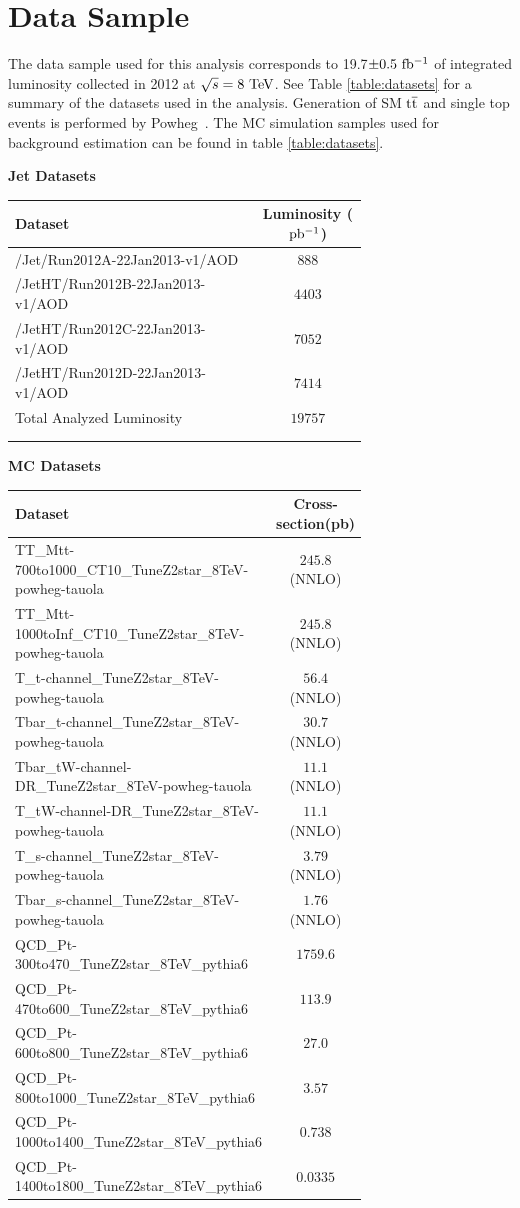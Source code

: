 \section{Data Sample}
\label{sec:datasampleAndSelection}
The data sample used for this analysis corresponds to 19.7$\pm0.5~\mathrm{fb^{-1}}$ of integrated 
luminosity collected in 2012 at $\sqrt{s} = 8~\mathrm{TeV}$.  See Table \ref{table:datasets} for a summary of the datasets used in the analysis.
Generation of SM $\mathrm{t\overline{t}}$ and single top events is performed by Powheg~\cite{Oleari:2010nx}.  
The MC simulation samples used for background estimation can be found in table \ref{table:datasets}.

\begin{table}
\begin{center}
\bf{Jet Datasets}
\begin{tabular}{p{0.7\linewidth}|c}
\hline\hline
\bf{Dataset} & \bf{Luminosity ($\mathrm{pb^{-1}}$)} \\
\hline\hline
/Jet/Run2012A-22Jan2013-v1/AOD & $888$ \\
/JetHT/Run2012B-22Jan2013-v1/AOD & $4403$ \\
/JetHT/Run2012C-22Jan2013-v1/AOD & $7052$ \\
/JetHT/Run2012D-22Jan2013-v1/AOD & $7414$ \\
Total Analyzed Luminosity & $19757$ \\
\hline 
\\
\\
\end{tabular}
\bf{MC Datasets} \\
\begin{tabular}{p{0.7\linewidth}|c}
\hline\hline
\bf{Dataset} & \bf{Cross-section(pb)} \\
\hline\hline
TT\_Mtt-700to1000\_CT10\_TuneZ2star\_8TeV-powheg-tauola & $245.8$ (NNLO)\\
TT\_Mtt-1000toInf\_CT10\_TuneZ2star\_8TeV-powheg-tauola & $245.8$ (NNLO)\\
T\_t-channel\_TuneZ2star\_8TeV-powheg-tauola & $56.4$ (NNLO)\\
Tbar\_t-channel\_TuneZ2star\_8TeV-powheg-tauola & $30.7$ (NNLO)\\
Tbar\_tW-channel-DR\_TuneZ2star\_8TeV-powheg-tauola & $11.1$ (NNLO)\\
T\_tW-channel-DR\_TuneZ2star\_8TeV-powheg-tauola & $11.1$ (NNLO)\\
T\_s-channel\_TuneZ2star\_8TeV-powheg-tauola & $3.79$ (NNLO)\\
Tbar\_s-channel\_TuneZ2star\_8TeV-powheg-tauola & $1.76$ (NNLO)\\
QCD\_Pt-300to470\_TuneZ2star\_8TeV\_pythia6 & $1759.6$ \\
QCD\_Pt-470to600\_TuneZ2star\_8TeV\_pythia6 & $113.9$ \\
QCD\_Pt-600to800\_TuneZ2star\_8TeV\_pythia6 & $27.0$ \\
QCD\_Pt-800to1000\_TuneZ2star\_8TeV\_pythia6 & $3.57$ \\
QCD\_Pt-1000to1400\_TuneZ2star\_8TeV\_pythia6 & $0.738$ \\
QCD\_Pt-1400to1800\_TuneZ2star\_8TeV\_pythia6 & $0.0335$ \\
\hline


\end{tabular}
\end{center}
\end{table}
